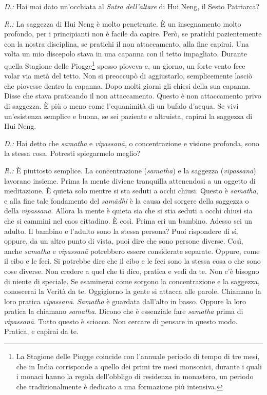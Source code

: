 \emph{D.:} Hai mai dato un'occhiata al \emph{Sutra dell'altare} di Hui Neng, il
Sesto Patriarca?

\emph{R.:} La saggezza di Hui Neng è molto penetrante. È un insegnamento molto
profondo, per i principianti non è facile da capire. Però, se pratichi
pazientemente con la nostra disciplina, se pratichi il non attaccamento,
alla fine capirai. Una volta un mio discepolo stava in una capanna con
il tetto impagliato. Durante quella Stagione delle Piogge\footnote{La
  Stagione delle Piogge coincide con l'annuale periodo di tempo di tre
  mesi, che in India corrisponde a quello dei primi tre mesi monsonici,
  durante i quali i monaci hanno la regola dell'obbligo di residenza in
  monastero, un periodo che tradizionalmente è dedicato a una formazione
  più intensiva.} spesso pioveva e, un giorno, un forte vento fece volar
via metà del tetto. Non si preoccupò di aggiustarlo, semplicemente
lasciò che piovesse dentro la capanna. Dopo molti giorni gli chiesi
della sua capanna. Disse che stava praticando il non attaccamento.
Questo è non attaccamento privo di saggezza. È più o meno come
l'equanimità di un bufalo d'acqua. Se vivi un'esistenza semplice e
buona, se sei paziente e altruista, capirai la saggezza di Hui Neng.

\emph{D.:} Hai detto che \emph{samatha} e \emph{vipassanā}, o concentrazione e
visione profonda, sono la stessa cosa. Potresti spiegarmelo meglio?

\emph{R.:} È piuttosto semplice. La concentrazione (\emph{samatha}) e la
saggezza (\emph{vipassanā}) lavorano insieme. Prima la mente diviene
tranquilla attenendosi a un oggetto di meditazione. È quieta solo mentre
si sta seduti a occhi chiusi. Questo è \emph{samatha}, e alla fine tale
fondamento del \emph{samādhi} è la causa del sorgere della saggezza o
della \emph{vipassanā}. Allora la mente è quieta sia che si stia seduti
a occhi chiusi sia che si cammini nel caos cittadino. È così. Prima eri
un bambino. Adesso sei un adulto. Il bambino e l'adulto sono la stessa
persona? Puoi rispondere di sì, oppure, da un altro punto di vista, puoi
dire che sono persone diverse. Così, anche \emph{samatha} e
\emph{vipassanā} potrebbero essere considerate separate. Oppure, come il
cibo e le feci. Si potrebbe dire che il cibo e le feci sono la stessa
cosa o che sono cose diverse. Non credere a quel che ti dico, pratica e
vedi da te. Non c'è bisogno di niente di speciale. Se esaminerai come
sorgono la concentrazione e la saggezza, conoscerai la Verità da te.
Oggigiorno la gente si attacca alle parole. Chiamano la loro pratica
\emph{vipassanā}. \emph{Samatha} è guardata dall'alto in basso. Oppure
la loro pratica la chiamano \emph{samatha}. Dicono che è essenziale fare
\emph{samatha} prima di \emph{vipassanā}. Tutto questo è sciocco. Non
cercare di pensare in questo modo. Pratica, e capirai da te.

